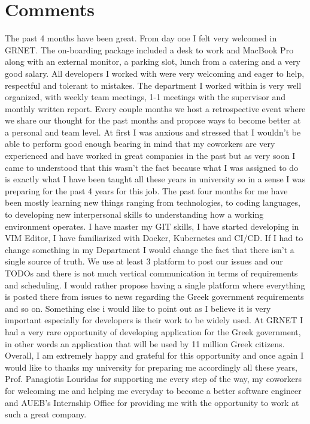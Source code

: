 \section{Comments}
The past 4 months have been great. From day one I felt very welcomed in GRNET. The on-boarding package included  a desk to work and MacBook Pro along with an external monitor, a parking slot, lunch from
a catering and a very good salary. All developers I worked with were very welcoming and eager to help, respectful and tolerant to mistakes. The department I worked within is very well organized, with weekly team meetings, 1-1 meetings with the supervisor and monthly written report. Every couple months we host a retrospective event where we share our thought for the past months and propose ways to become better at a personal and team level. At first I was anxious and stressed that I wouldn't be able to perform good enough bearing in mind that my coworkers are very experienced and have worked in great companies in the past but as very soon I came to understood that this wasn't the fact because what I was assigned to do is exactly what I have been taught all these years in university so in a sense I was preparing for the past 4 years for this job. The past four months for me have been mostly learning new things ranging from technologies, to coding languages, to developing new interpersonal skills to understanding how a working environment operates. I have master my GIT skills, I have started developing in VIM Editor, I have familiarized with Docker, Kubernetes and CI/CD. If I had to change something in my Department I would change the fact that there isn't a single source of truth. We use at least 3 platform to post our issues and our TODOs
and there is not much vertical communication in terms of requirements and scheduling. I would rather propose having a single platform where everything is posted there from issues to news regarding the Greek government requirements and so on. Something else i would like to point out as I believe it is very important especially for developers is their work to be widely used. At GRNET I had a very rare opportunity of developing application for the Greek government, in other words an application that will be used by 11 million Greek citizens. Overall, I am extremely happy and grateful for this opportunity and once again I would like to thanks my university for preparing me accordingly all these years, Prof. Panagiotis Louridas for supporting me every step of the way, my coworkers for welcoming me and helping me everyday to become a better software engineer and AUEB's Internship Office for providing me with the opportunity to work at such a great company.


